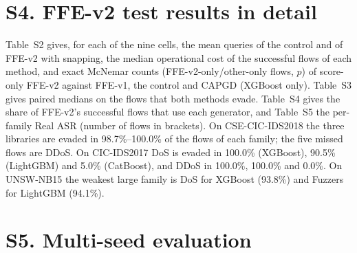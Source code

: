 \section*{S4. FFE-v2 test results in detail}

Table~S2 gives, for each of the nine cells, the mean queries of the control and of FFE-v2 with snapping, the median operational cost of the successful flows of each method, and exact McNemar counts (FFE-v2-only/other-only flows, $p$) of score-only FFE-v2 against FFE-v1, the control and CAPGD (XGBoost only). Table~S3 gives paired medians on the flows that both methods evade. Table~S4 gives the share of FFE-v2's successful flows that use each generator, and Table~S5 the per-family Real ASR (number of flows in brackets). On CSE-CIC-IDS2018 the three libraries are evaded in 98.7\%--100.0\% of the flows of each family; the five missed flows are DDoS. On CIC-IDS2017 DoS is evaded in 100.0\% (XGBoost), 90.5\% (LightGBM) and 5.0\% (CatBoost), and DDoS in 100.0\%, 100.0\% and 0.0\%. On UNSW-NB15 the weakest large family is DoS for XGBoost (93.8\%) and Fuzzers for LightGBM (94.1\%).

\begin{table}[!htbp]
\centering
\caption*{Table S2. Queries, median operational cost of successful flows and exact McNemar tests (FFE-v2-only/other-only, $p$).}
\scriptsize
\setlength{\tabcolsep}{3pt}
\resizebox{\textwidth}{!}{%
%
}
\end{table}

\begin{table}[!htbp]
\centering
\caption*{Table S3. Paired median operational cost (FFE-v2 / other method) on the flows both evade.}
\footnotesize

\end{table}

\begin{table}[!htbp]
\centering
\caption*{Table S4. Share (\%) of FFE-v2's successful flows that use each generator.}
\footnotesize

\end{table}

\begin{table}[!htbp]
\centering
\caption*{Table S5. Real ASR (\%) of FFE-v2 by attack family (number of flows).}
\footnotesize

\end{table}

\section*{S5. Multi-seed evaluation}

